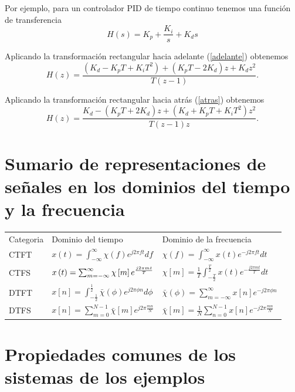 Por ejemplo, para un controlador PID de tiempo continuo tenemos una funci\'{o}n de transferencia
\begin{equation}
        H(s) = K_{p} + \frac{K_{i}}{s} + K_{d} s
\end{equation}

Aplicando la transformaci\'{o}n rectangular hacia adelante (\ref{adelante}) obtenemos
\begin{equation}
        H(z) = \frac{(K_{d} - K_{p} T + K_{i} T^{2}) +
                        (K_{p} T - 2 K_{d}) z + K_{d} z^2}
                    {T (z - 1)}.
\end{equation}

Aplicando la transformaci\'{o}n rectangular hacia atr\'{a}s (\ref{atras}) obtenemos
\begin{equation}
        H(z) = \frac{K_{d} -
                        (K_{p} T + 2 K_{d}) z + (K_{d} + K_{p} T + K_{i} T^{2}) z^2}
                    {T (z - 1) z}.
\end{equation}

\section{Sumario de representaciones de se\~{n}ales en los dominios del tiempo y la frecuencia}

\begin{tabular}{lll}
Categoria & Dominio del tiempo & Dominio de la frecuencia \\ 
CTFT & $x\left( t\right) =\int_{-\infty }^{\infty }\chi \left( f\right)
e^{j2\pi ft}df$ & $\chi \left( f\right) =\int_{-\infty }^{\infty }x\left(
t\right) e^{-j2\pi ft}dt$ \\ 
CTFS & $x\left( t\right) =\sum_{m=-\infty }^{\infty }\chi \left[ m\right] e^{%
\frac{j2\pi mt}{T}}$ & $\chi \left[ m\right] =\frac{1}{T}\int_{-\frac{T}{2%
}}^{\frac{T}{2}}x\left( t\right) e^{-\frac{j2\pi mt}{T}}dt$ \\ 
DTFT & $x\left[ n\right] =\int_{-\frac{1}{2}}^{\frac{1}{2}}\bar{\chi}%
\left( \phi \right) e^{j2\pi \phi n}d\phi $ & $\bar{\chi}\left( \phi \right)
=\sum_{m=-\infty }^{\infty }x\left[ n\right] e^{-j2\pi \phi n}$ \\ 
DTFS & $x\left[ n\right] =\sum_{m=0}^{N-1}\bar{\chi}\left[ m\right] e^{j2\pi 
\frac{mn}{N}}$ & $\bar{\chi}\left[ m\right] =\frac{1}{N}\sum_{n=0}^{N-1}x%
\left[ n\right] e^{-j2\pi \frac{mn}{N}}$%
\end{tabular}



\section{Propiedades comunes de los sistemas de los ejemplos}

